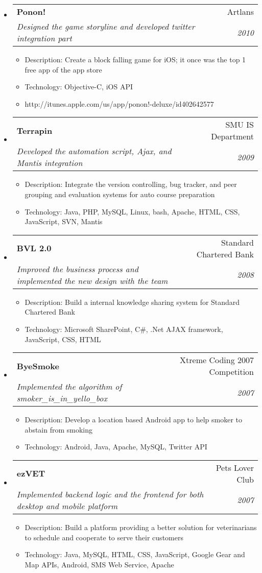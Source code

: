 \documentclass[twoside,letterpaper,11pt]{article}
\makeatletter
\newcommand{\resitem}[1]{\item #1 \vspace{-5pt}}
\newcommand{\resheading}[1]{
  \parbox{\textwidth}{
    \begin{shaded}
      \textbf{\sffamily{\mbox{~}{\large #1} \vphantom{p\^{E}}}}
    \end{shaded}
  }\vspace{-6px}
}
\newcommand{\ressubheading}[4]{
\begin{tabular*}{7in}{l@{\extracolsep{\fill}}r}
		\textbf{#1} & #2 \\
		\textit{#3} & \textit{#4} \\
\end{tabular*}\vspace{-6pt}}
\makeatother
\begin{document}
\resheading{Projects}
\begin{itemize}
\item
	\ressubheading{Ponon!}{Artlans}{Designed the game storyline and developed twitter integration part}{2010}
	\begin{itemize}
		\resitem{Description: Create a block falling game for iOS; it once was the top 1 free app of the app store}
		\resitem{Technology: Objective-C, iOS API}
		\resitem{http://itunes.apple.com/us/app/ponon!-deluxe/id402642577}
	\end{itemize}

\item 
	\ressubheading{Terrapin}{SMU IS Department}{Developed the automation script, Ajax, and Mantis integration}{2009}
	\begin{itemize}
		\resitem{Description: Integrate the version controlling, bug tracker, and peer grouping and evaluation systems for auto course preparation}
		\resitem{Technology: Java, PHP, MySQL, Linux, bash, Apache, HTML, CSS, JavaScript, SVN, Mantis}
	\end{itemize}


\item
	\ressubheading{BVL 2.0}{Standard Chartered Bank}{Improved the business process and implemented the new design with the team}{2008}
	\begin{itemize}
		\resitem{Description: Build a internal knowledge sharing system for Standard Chartered Bank}
		\resitem{Technology: Microsoft SharePoint, C\#, .Net AJAX framework, JavaScript, CSS, HTML}
	\end{itemize}

\item
	\ressubheading{ByeSmoke}{Xtreme Coding 2007 Competition}{Implemented the algorithm of smoker\_is\_in\_yello\_box }{2007}
	\begin{itemize}
		\resitem{Description: Develop a location based Android app to help smoker to abstain from smoking}
		\resitem{Technology: Android, Java, Apache, MySQL, Twitter API}
	\end{itemize}

\item
	\ressubheading{ezVET}{Pets Lover Club}{Implemented backend logic and the frontend for both desktop and mobile platform}{2007}
	\begin{itemize}
		\resitem{Description: Build a platform providing a better solution for veterinarians to schedule and cooperate to serve their customers}
		\resitem{Technology: Java, MySQL, HTML, CSS, JavaScript, Google Gear and Map APIs, Android, SMS Web Service, Apache}
	\end{itemize}
\end{itemize}
\end{document}
